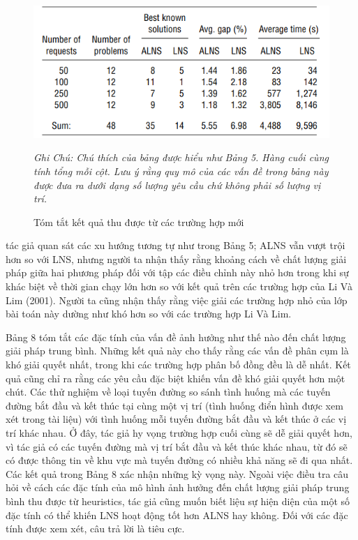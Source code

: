 \begin{center}
    \begin{figure}[htp]
    \caption{Tóm tắt kết quả thu được từ các trường hợp mới}        
    \begin{center}
     \includegraphics[scale=.6]{figures/Thuy_table6}
    \end{center}
  \textit{Ghi Chú: Chú thích của bảng được hiểu như Bảng 5. Hàng cuối cùng tính tổng mỗi cột. Lưu ý rằng quy mô của các vấn đề trong bảng này được đưa ra dưới dạng số lượng yêu cầu chứ không phải số lượng vị trí.}
    \end{figure}
\end{center}

tác giả quan sát các xu hướng tương tự như trong Bảng 5; ALNS vẫn vượt trội hơn so với LNS, nhưng người ta nhận thấy rằng khoảng cách về chất lượng giải pháp giữa hai phương pháp đối với tập các điều chỉnh này nhỏ hơn trong khi sự khác biệt về thời gian chạy lớn hơn so với kết quả trên các trường hợp của Li Và Lim (2001). Người ta cũng nhận thấy rằng việc giải các trường hợp nhỏ của lớp bài toán này dường như khó hơn so với các trường hợp Li Và Lim.

Bảng 8 tóm tắt các đặc tính của vấn đề ảnh hưởng như thế nào đến chất lượng giải pháp trung bình. Những kết quả này cho thấy rằng các vấn đề phân cụm là khó giải quyết nhất, trong khi các trường hợp phân bố đồng đều là dễ nhất. Kết quả cũng chỉ ra rằng các yêu cầu đặc biệt khiến vấn đề khó giải quyết hơn một chút. Các thử nghiệm về loại tuyến đường so sánh tình huống mà các tuyến đường bắt đầu và kết thúc tại cùng một vị trí (tình huống điển hình được xem xét trong tài liệu) với tình huống mỗi tuyến đường bắt đầu và kết thúc ở các vị trí khác nhau. Ở đây, tác giả hy vọng trường hợp cuối cùng sẽ dễ giải quyết hơn, vì tác giả có các tuyến đường mà vị trí bắt đầu và kết thúc khác nhau, từ đó sẽ có được thông tin về khu vực mà tuyến đường có nhiều khả năng sẽ đi qua nhất. Các kết quả trong Bảng 8 xác nhận những kỳ vọng này.
Ngoài việc điều tra câu hỏi về cách các đặc tính của mô hình ảnh hưởng đến chất lượng giải pháp trung bình thu được từ heuristics, tác giả cũng muốn biết liệu sự hiện diện của một số đặc tính có thể khiến LNS hoạt động tốt hơn ALNS hay không. Đối với các đặc tính được xem xét, câu trả lời là tiêu cực.

